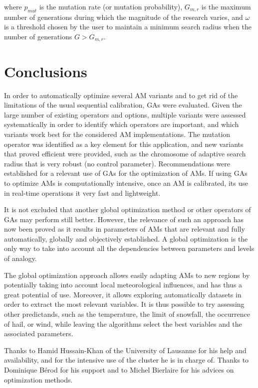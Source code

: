 \documentclass{ametsoc}
\begin{document}
where $p_{mut}$ is the mutation rate (or mutation probability), $G_{m,r}$ is the maximum number of generations during which the magnitude of the research varies, and $\omega$ is a threshold chosen by the user to maintain a minimum search radius when the number of generations $G>G_{m,r}$.


\section{Conclusions}
\label{sec:conclusions}

In order to automatically optimize several AM variants and to get rid of the limitations of the usual sequential calibration, GAs were evaluated. Given the large number of existing operators and options, multiple variants were assessed systematically in order to identify which operators are important, and which variants work best for the considered AM implementations. The mutation operator was identified as a key element for this application, and new variants that proved efficient were provided, such as the chromosome of adaptive search radius that is very robust (no control parameter). Recommendations were established for a relevant use of GAs for the optimization of AMs. If using GAs to optimize AMs is computationally intensive, once an AM is calibrated, its use in real-time operations it very fast and lightweight.

It is not excluded that another global optimization method or other operators of GAs may perform still better. However, the relevance of such an approach has now been proved as it results in parameters of AMs that are relevant and fully automatically, globally and objectively established. A global optimization is the only way to take into account all the dependencies between parameters and levels of analogy.

The global optimization approach allows easily adapting AMs to new regions by potentially taking into account local meteorological influences, and has thus a great potential of use. Moreover, it allows exploring automatically datasets in order to extract the most relevant variables. It is thus possible to try assessing other predictands, such as the temperature, the limit of snowfall, the occurrence of hail, or wind, while leaving the algorithms select the best variables and the associated parameters.


%
\acknowledgments
Thanks to Hamid Hussain-Khan of the University of Lausanne for his help and availability, and for the intensive use of the cluster he is in charge of. Thanks to Dominique B\'{e}rod for his support and to Michel Bierlaire for his advices on optimization methods.
\end{document}
